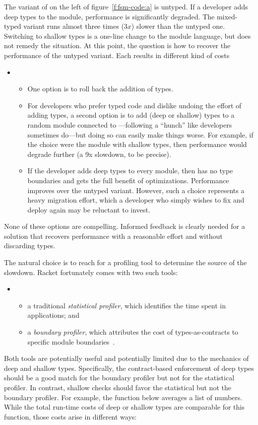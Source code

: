The variant of  on the left of figure~\ref{f:fsm-code:a} is untyped.
If a developer adds deep types to the  module, performance is
significantly degraded. The mixed-typed variant runs almost three times
($3x$) slower than the untyped one.  Switching to shallow types is a one-line
change to the module language, but does not remedy the situation.
At this point, the question is how to recover the performance of the untyped
variant. Each results in different kind of costs  
\begin{itemize} \item[] \begin{itemize}
  \item
One option is to roll back the addition of types.
  \item
For developers who prefer typed code and dislike undoing the effort of
adding types, a second option is to add
(deep or shallow) types to a random module connected to ---following a
``hunch'' like developers sometimes do---but doing so can easily make things
worse. For example, if the choice were the  module with shallow
types, then performance would degrade further (a 9x slowdown, to be
precise).
  \item
If the developer adds deep types to every module, then 
has no type boundaries and gets the full benefit of optimizations. Performance
improves over the untyped variant.
However, such a choice
represents a heavy migration effort, which a developer who simply
wishes to fix  and deploy again may be reluctant to invest.
\end{itemize} \end{itemize}
None of these options are compelling.
Informed feedback is clearly needed for a solution that recovers performance
with a reasonable effort and without discarding types.

The natural choice is to reach for a
profiling tool to determine the source of the slowdown.
Racket fortunately comes with two such tools: 
\begin{itemize} \item[] \begin{itemize}

\item a traditional \emph{statistical profiler}, which identifies the time spent
 in applications; and

\item a \emph{boundary profiler}, which  attributes the cost of types-as-contracts to
 specific module boundaries~\cite{astavf-feature-prf, staaf-feature-prf}.

\end{itemize} \end{itemize}
Both tools are potentially useful and potentially limited due to the mechanics
of deep and shallow types. Specifically, the contract-based enforcement of
deep types should be a good match for the boundary profiler but not
for the statistical profiler. In contrast, shallow checks
should favor the statistical but not the boundary profiler.
For example, the function below averages a list of numbers.
While the total run-time costs of deep or shallow types are comparable
for this function, those costs arise in different ways:


